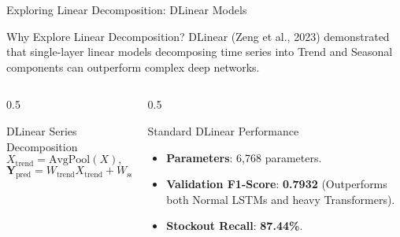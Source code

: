 \documentclass[10pt, aspectratio=169]{beamer}
\begin{document}
\begin{frame}{Exploring Linear Decomposition: DLinear Models}
  \begin{block}{Why Explore Linear Decomposition?}
    DLinear (Zeng et al., 2023) demonstrated that single-layer linear models decomposing time series into Trend and Seasonal components can outperform complex deep networks.
  \end{block}

  \begin{columns}[T]
    \begin{column}{0.5\textwidth}
      \begin{block}{DLinear Series Decomposition}
        $$X_{\text{trend}} = \text{AvgPool}(X), \quad X_{\text{seasonal}} = X - X_{\text{trend}}$$
        $$\mathbf{Y}_{\text{pred}} = W_{\text{trend}} X_{\text{trend}} + W_{\text{seasonal}} X_{\text{seasonal}}$$
      \end{block}
    \end{column}
    
    \begin{column}{0.5\textwidth}
      \begin{block}{Standard DLinear Performance}
        \begin{itemize}
          \item \textbf{Parameters}: 6,768 parameters.
          \item \textbf{Validation F1-Score}: \textbf{0.7932} (Outperforms both Normal LSTMs and heavy Transformers).
          \item \textbf{Stockout Recall}: \textbf{87.44\%}.
        \end{itemize}
      \end{block}
    \end{column}
  \end{columns}
\end{frame}
\end{document}
